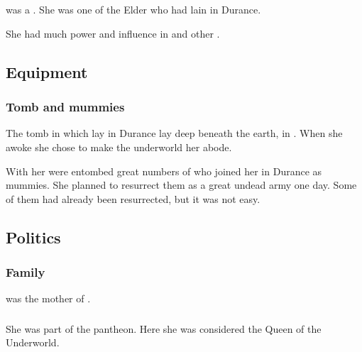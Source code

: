 \section{\Thessulax}
\index{\Thessulax}
\Thessulax was a \dragon. 
She was one of the Elder \Dragons who had lain in Durance. 

She had much power and influence in  and other . 









\subsection{Equipment}





\subsubsection{Tomb and mummies}
The tomb in which \Thessulax lay in Durance lay deep beneath the earth, in \KaiLeng. 
When she awoke she chose to make the underworld her abode. 

With her were entombed great numbers of \ophidians who joined her in Durance as mummies. 
She planned to resurrect them as a great undead army one day. 
Some of them had already been resurrected, but it was not easy. 









\subsection{Politics}





\subsubsection{Family}
\Thessulax was the mother of . 





\subsubsection{\Taortha}
She was part of the \taortha pantheon.
Here she was considered the Queen of the Underworld. 

















